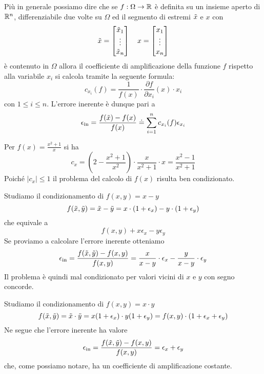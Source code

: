 Più in generale possiamo dire che se $f : \Omega \to \mathbb{R}$ è definita su un insieme aperto di $\mathbb{R}^n$, differenziabile
due volte su $\Omega$ ed il segmento di estremi $\tilde{x}$ e $x$ con
\[
	\tilde{x} = \begin{bmatrix}
		\tilde{x}_1 \\ \vdots \\ \tilde{x}_n
	\end{bmatrix} \quad
	x = \begin{bmatrix}
		x_1 \\ \vdots \\ x_n
	\end{bmatrix}
\]
è contenuto in $\Omega$ allora il coefficiente di amplificazione della funzione $f$ rispetto alla variabile
$x_i$ si calcola tramite la seguente formula:
\[ c_{x_i} (f) = \frac{1}{f(x)} \cdot \frac{\partial f}{\partial x_i} (x) \cdot x_i \]
con $1 \leq i \leq n$. L'errore inerente è dunque pari a
\[ \epsilon_\text{in} = \frac{f(\tilde{x}) - f(x)}{f(x)} \doteq \sum_{i=1}^n c_{x_i} (f) \epsilon_{x_i} \]

\begin{example}
	Per $f(x) = \frac{x^2 + 1}{x}$ si ha
	\[
		c_x = \left( 2 - \frac{x^2 + 1}{x^2} \right) \cdot \frac{x}{x^2 + 1} \cdot x =
		\frac{x^2 - 1}{x^2 + 1}
	\]
	Poiché $|c_x| \leq 1$ il problema del calcolo di $f(x)$ risulta ben condizionato.
\end{example}

\begin{example}
	Studiamo il condizionamento di $f(x, y) = x - y$
	\[ f(\tilde{x}, \tilde{y}) = \tilde{x} - \tilde{y} = x \cdot (1 + \epsilon_x) - y \cdot (1 + \epsilon_y) \]
	che equivale a
	\[ f(x, y) + x \epsilon_x - y \epsilon_y \]
	Se proviamo a calcolare l'errore inerente otteniamo
	\[
		\epsilon_\text{in} = \frac{f(\tilde{x}, \tilde{y}) - f(x, y)}{f(x, y)} =
		\frac{x}{x - y} \cdot \epsilon_x - \frac{y}{x - y} \cdot \epsilon_y
	\]
	Il problema è quindi mal condizionato per valori vicini di $x$ e $y$ con segno concorde.
\end{example}

\begin{example}
	Studiamo il condizionamento di $f(x, y) = x \cdot y$
	\[
		f(\tilde{x}, \tilde{y}) = \tilde{x} \cdot \tilde{y} = x (1 + \epsilon_x) \cdot y (1 + \epsilon_y) =
		f(x, y) \cdot (1 + \epsilon_x + \epsilon_y)
	\]
	Ne segue che l'errore inerente ha valore
	\[ \epsilon_\text{in} = \frac{f(\tilde{x}, \tilde{y}) - f(x, y)}{f(x, y)} = \epsilon_x + \epsilon_y \]
	che, come possiamo notare, ha un coefficiente di amplificazione costante.
\end{example}

